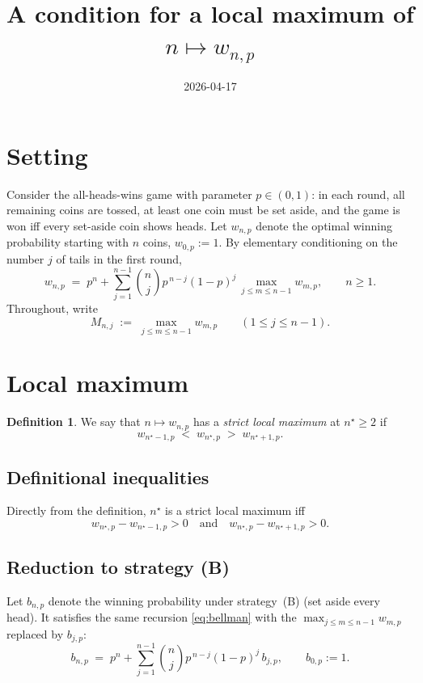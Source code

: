 \documentclass{article}
\title{A condition for a local maximum of $n\mapsto w_{n,p}$}
\author{}
\date{2026-04-17}
\theoremstyle{definition}
\newtheorem*{definition*}{Definition}
\theoremstyle{remark}
\begin{document}
\maketitle

\section*{Setting}

Consider the all-heads-wins game with parameter $p\in(0,1)$: in each round,
all remaining coins are tossed, at least one coin must be set aside, and
the game is won iff every set-aside coin shows heads. Let $w_{n,p}$ denote
the optimal winning probability starting with $n$ coins, $w_{0,p}:=1$.
By elementary conditioning on the number $j$ of tails in the first round,
\begin{equation}\label{eq:bellman}
  w_{n,p}\;=\;p^{n}+\sum_{j=1}^{n-1}\binom{n}{j}p^{\,n-j}(1-p)^{j}\,
  \max_{j\le m\le n-1}w_{m,p},\qquad n\ge 1.
\end{equation}
Throughout, write
\[
  M_{n,j}\;:=\;\max_{j\le m\le n-1}w_{m,p}\qquad(1\le j\le n-1).
\]

\section*{Local maximum}

\begin{definition*}
We say that $n\mapsto w_{n,p}$ has a \emph{strict local maximum} at
$n^{\star}\ge 2$ if
\[
  w_{n^{\star}-1,p}\;<\;w_{n^{\star},p}\;>\;w_{n^{\star}+1,p}.
\]
\end{definition*}

\subsection*{Definitional inequalities}

Directly from the definition, $n^{\star}$ is a strict local maximum iff
\begin{equation}\label{eq:def}
  w_{n^{\star},p}-w_{n^{\star}-1,p}>0
  \quad\text{and}\quad
  w_{n^{\star},p}-w_{n^{\star}+1,p}>0.
\end{equation}

\subsection*{Reduction to strategy (B)}

Let $b_{n,p}$ denote the winning probability under strategy~(B) (set aside
every head). It satisfies the same recursion \eqref{eq:bellman} with the
$\max_{j\le m\le n-1}w_{m,p}$ replaced by $b_{j,p}$:
\begin{equation}\label{eq:brec}
  b_{n,p}\;=\;p^{n}+\sum_{j=1}^{n-1}\binom{n}{j}p^{\,n-j}(1-p)^{j}\,b_{j,p},
  \qquad b_{0,p}:=1.
\end{equation}
\end{document}
